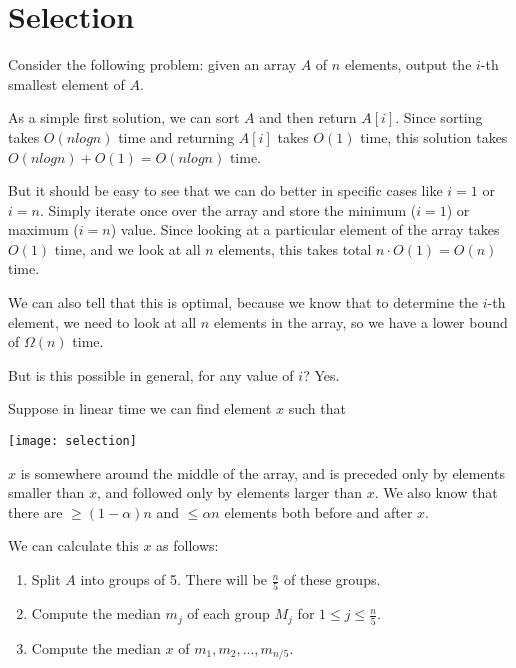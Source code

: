 \chapter{Selection}
\label{chapter:selection}

Consider the following problem: given an array $A$ of $n$ elements,
output the $i$-th smallest element of $A$.

As a simple first solution, we can sort $A$ and then return $A[i]$.
Since sorting takes $O(nlogn)$ time and returning $A[i]$ takes $O(1)$
time, this solution takes $O(nlogn) + O(1) = O(nlogn)$ time.

But it should be easy to see that we can do better in specific cases
like $i=1$ or $i=n$.  Simply iterate once over the array and store the
minimum ($i=1$) or maximum ($i=n$) value.  Since looking at a
particular element of the array takes $O(1)$ time, and we look at all
$n$ elements, this takes total $n \cdot O(1) = O(n)$ time.

We can also tell that this is optimal, because we know that to
determine the $i$-th element, we need to look at all $n$ elements in
the array, so we have a lower bound of $\Omega (n)$ time.

But is this possible in general, for any value of $i$?  Yes.

Suppose in linear time we can find element $x$ such that

{
  \texttt{[image: selection]}
  \label{fig:selection}
}

$x$ is somewhere around the middle of the array, and is preceded only
by elements smaller than $x$, and followed only by elements larger
than $x$.  We also know that there are $ \geq (1-\alpha)n $ and $ \leq
\alpha n $ elements both before and after $x$.

We can calculate this $x$ as follows:

\begin{enumerate}

\item Split $A$ into groups of 5.  There will be $\frac{n}{5}$ of
  these groups.
\item Compute the median $m_j$ of each group $M_j$ for $ 1 \leq j \leq
  \frac{n}{5} $.
\item Compute the median $x$ of $m_1,m_2,...,m_{n/5}$.

\end{enumerate}

